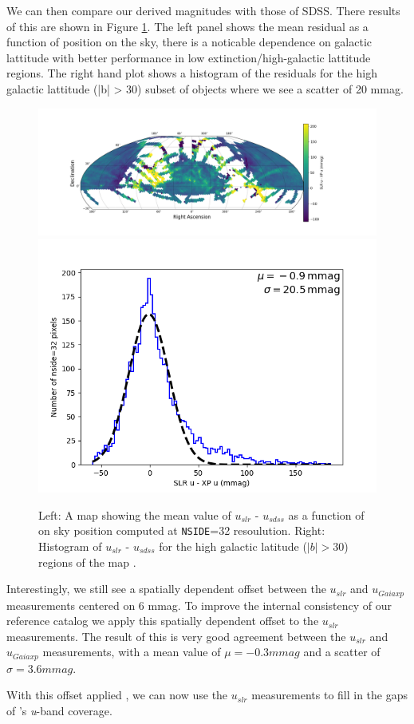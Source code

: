 We can then compare our derived magnitudes with those of SDSS. There results of this are shown in Figure \ref{fig:slr_sdss_compare}. The left panel shows the mean residual as a function of position on the sky, there is a noticable dependence on galactic lattitude with better performance in low extinction/high-galactic lattitude regions. The right hand plot shows a histogram of the residuals for the high galactic lattitude (|b| > 30) subset of objects where we see a scatter of 20 mmag.  
\begin{figure}
    \includegraphics[width=0.64\linewidth]{./figures/u-band/uslr/uslr-usdss_full_map.png}
    \includegraphics[width=0.32\linewidth]{./figures/u-band/uslr/uslr-usdss_highglat_hist.png}

    \label{fig:slr_sdss_compare}
    \caption{
    Left: A map showing the mean value of $u_{slr}$ - $u_{sdss}$ as a function of on sky position computed at \texttt{NSIDE}=32 resoulution.  
    Right: Histogram of $u_{slr}$ - $u_{sdss}$ for the high galactic latitude ($|b| > 30$) regions of the map . }
\end{figure}

Interestingly, we still see a spatially dependent offset between the $u_{slr}$ and $u_{Gaiaxp}$ measurements centered on 6 mmag.
To improve the internal consistency of our reference catalog we apply this spatially dependent offset to the $u_{slr}$ measurements.
The result of this is very good agreement between the $u_{slr}$ and $u_{Gaiaxp}$ measurements, with a mean value of $\mu = -0.3 mmag$ and a scatter of $\sigma = 3.6 mmag$. 

With this offset applied , we can now use the $u_{slr}$ measurements to fill in the gaps of \monster's \textit{u}-band coverage.

